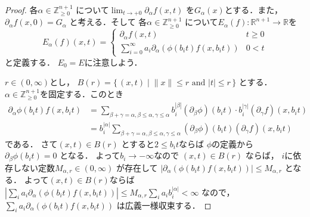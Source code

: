 \documentclass[leqno, a4paper, 12pt]{jsarticle}
\newcommand{\zz}{\mathbb{Z}}
\newcommand{\rr}{\mathbb{R}}
\begin{document}
\begin{proof}

各$\alpha\in \zz_{\ge 0}^{n+1}$
について$\lim_{t\to +0}\partial_{\alpha}f(x, t)$
を$G_{\alpha}(x)$とする．また，
$\partial_{\alpha}f(x, 0)=G_{\alpha}$
と考える．そして
各$\alpha\in \zz_{\ge 0}^{n+1}$
について$E_{\alpha}(f)\colon \rr^{n+1}\to \rr$を
\[
E_{\alpha}(f)(x, t)=
\begin{cases}
\partial_{\alpha}f(x, t) & \text{$t\ge 0$}\\
\displaystyle \sum_{i=0}^{\infty}a_{i}
\partial_{\alpha}(
\phi(b_{i}t)f(x, b_{i}t))
& \text{$0<t$}
\end{cases}
\]
と定義する．
$E_{0}=E$に注意しよう．

$r\in (0, \infty)$とし，
$B(r)=\{\, (x, t)\mid 
\text{$\|x\|\le r$ and  $|t|\le r$}\, \}$
とする．
$\alpha\in \zz_{\ge 0}^{n+1}$を固定する．このとき
\begin{align*}
\partial_{\alpha}\phi(b_{i}t)f(x, b_{i}t)
&=\sum_{\beta+\gamma=\alpha, \beta\le \alpha, \gamma\le \alpha}b_{i}^{|\beta|}(\partial_{\beta}\phi)(b_{i}t)
\cdot b_{i}^{|\gamma|}(\partial_{\gamma}f)(x, b_{i}t)\\
&=b_{i}^{|\alpha|}
\sum_{\beta+\gamma=\alpha, 
\beta\le \alpha, \gamma\le \alpha}
(\partial_{\beta}\phi)(b_{i}t)
(\partial_{\gamma}f)(x, b_{i}t)
\end{align*}
である．
さて$(x, t)\in B(r)$
とすると$2\le b_{i}t$ならば
$\phi$の定義から$\partial_{\beta}\phi(b_{i}t)=0$
となる．
よって$b_{i}\to -\infty$なので
$(x, t)\in B(r)$
ならば，
$i$に依存しない定数$M_{\alpha, r}\in (0, \infty)$
が存在して
$|\partial_{\alpha}(\phi(b_{i}t)f(x, b_{i}t))|\le M_{\alpha, r}$
となる．
よって$(x, t)\in B(r)$ならば
$|\sum_{i}a_{i}\partial_{\alpha}(\phi(b_{i}t)f(x, b_{i}t))|
\le M_{\alpha, r}\sum_{i}a_{i}b_{i}^{|\alpha|}<\infty$
なので，
$\sum_{i}a_{i}\partial_{\alpha}(\phi(b_{i}t)f(x, b_{i}t))$
は広義一様収束する．


\end{proof}
\end{document}
